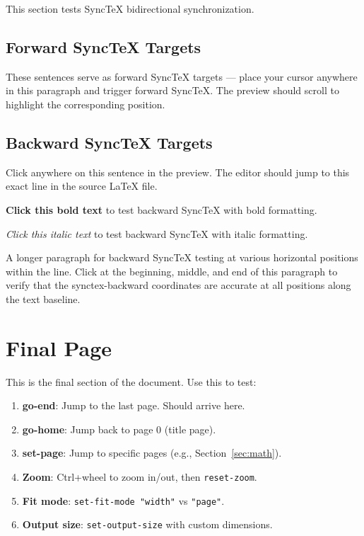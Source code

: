 \documentclass[12pt,a4paper]{article}
\begin{document}
This section tests SyncTeX bidirectional synchronization.

\subsection{Forward SyncTeX Targets}

These sentences serve as forward SyncTeX targets --- place your cursor
anywhere in this paragraph and trigger forward SyncTeX. The preview
should scroll to highlight the corresponding position.

\subsection{Backward SyncTeX Targets}

Click anywhere on this sentence in the preview. The editor should jump
to this exact line in the source \LaTeX{} file.

\textbf{Click this bold text} to test backward SyncTeX with bold formatting.

\textit{Click this italic text} to test backward SyncTeX with italic formatting.

A longer paragraph for backward SyncTeX testing at various horizontal
positions within the line. Click at the beginning, middle, and end of
this paragraph to verify that the synctex-backward coordinates are
accurate at all positions along the text baseline.

\section{Final Page}
\label{sec:final}

This is the final section of the document. Use this to test:

\begin{enumerate}
  \item \textbf{go-end}: Jump to the last page. Should arrive here.
  \item \textbf{go-home}: Jump back to page 0 (title page).
  \item \textbf{set-page}: Jump to specific pages (e.g., Section~\ref{sec:math}).
  \item \textbf{Zoom}: Ctrl+wheel to zoom in/out, then \texttt{reset-zoom}.
  \item \textbf{Fit mode}: \texttt{set-fit-mode "width"} vs \texttt{"page"}.
  \item \textbf{Output size}: \texttt{set-output-size} with custom dimensions.
\end{enumerate}
\end{document}

